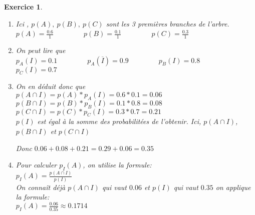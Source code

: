 \documentclass[10pt,a4paper]{article}
\theoremstyle{break}
\newtheorem{exo}{Exercice}
\begin{document}
\begin{exo}
\begin{enumerate}
\begin{tikzpicture}[grow=right, sloped]
\end{tikzpicture}

	\item Ici , $p(A),~p(B),~p(C)$ sont les 3 premières branches de l'arbre. 	
		$p(A) = \frac{0.6}{1}$ ~~~~~~~ $p(B) = \frac{0.1}{1}$ ~~~~~~~ $p(C) = \frac{0.3}{1}$
	\item On peut lire que \\
		$p_A(I) = 0.1$ ~~~~~~~ $p_A(\overline{I}) = 0.9$ ~~~~~~~ $p_B(I) = 0.8$ ~~~~~~~ $p_C(I) = 0.7$

	\item On en déduit donc que \\
		$p(A\cap I) = p(A)*p_A(I) = 0.6*0.1 = 0.06$	\\
		$p(B\cap I) = p(B)*p_B(I) = 0.1*0.8 = 0.08$ \\
		$p(C\cap I) = p(C)*p_C(I) = 0.3*0.7 = 0.21$ \\ 
		$p(I)$ est égal à la somme des probabilitées de l'obtenir. Ici, $p(A\cap I)$,$p(B\cap I)$ et $p(C\cap I)$\par  
	Donc $0.06+0.08+0.21 = 0.29+0.06 = 0.35$
	\item Pour calculer $p_I(A)$, on utilise la formule:\\
	$p_I(A) = \frac{p(A\cap I)}{p(I)}$ \\
	On connaît déjà $p(A\cap I)$ qui vaut $0.06$ et $p(I)$ qui vaut $0.35$ on applique la formule:\\
	$p_I(A) = \frac{0.06}{0.35} \approx 0.1714 $ \\

\end{enumerate}
	
\end{exo}
\end{document}
